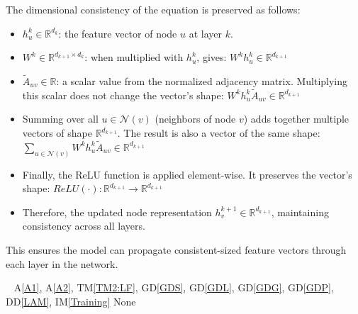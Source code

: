 \documentclass[12pt]{article}
\newcommand{\dref}[1]{GD\ref{#1}}
\newcommand{\ddref}[1]{DD\ref{#1}}
\newcommand{\tref}[1]{TM\ref{#1}}
\newcommand{\aref}[1]{A\ref{#1}}
\newcommand{\iref}[1]{IM\ref{#1}}
\begin{document}
{
The dimensional consistency of the equation is preserved as follows:

\begin{itemize}
    \item \( h_u^k \in \mathbb{R}^{d_k} \): the feature vector of node \( u \) at layer \( k \).
    \item \( W^k \in \mathbb{R}^{d_{k+1} \times d_k} \): when multiplied with \( h_u^k \), gives:
    \(
        W^k h_u^k \in \mathbb{R}^{d_{k+1}}
    \)
    \item \( \tilde{A}_{uv} \in \mathbb{R} \): a scalar value from the normalized adjacency matrix. Multiplying this scalar does not change the vector's shape:
    \(
        W^k h_u^k \tilde{A}_{uv} \in \mathbb{R}^{d_{k+1}}
    \)
    \item Summing over all \( u \in \mathcal{N}(v) \) (neighbors of node \( v \)) adds together multiple vectors of shape \( \mathbb{R}^{d_{k+1}} \). The result is also a vector of the same shape:
    \(
        \sum_{u \in \mathcal{N}(v)} W^k h_u^k \tilde{A}_{uv} \in \mathbb{R}^{d_{k+1}}
    \)
    \item Finally, the ReLU function is applied element-wise. It preserves the vector's shape:
    \(
        ReLU\left( \cdot \right) : \mathbb{R}^{d_{k+1}} \rightarrow \mathbb{R}^{d_{k+1}}
    \)
    \item Therefore, the updated node representation \( h_v^{k+1} \in \mathbb{R}^{d_{k+1}} \), maintaining consistency across all layers.
\end{itemize}

This ensures the model can propagate consistent-sized feature vectors through each layer in the network.
}
{
  ~\citep{kipf2016}
}
{
  \aref{A1}, \aref{A2}, \tref{TM2:LF}, \dref{GDS}, \dref{GDL}, \dref{GDG}, \dref{GDP}, \ddref{LAM}, \iref{Training}
}
{
None
}
{}
\end{document}
